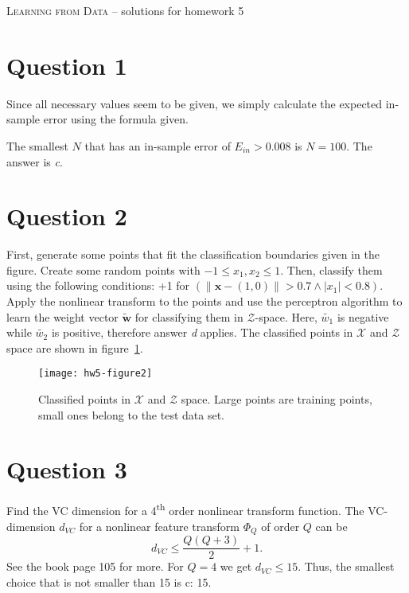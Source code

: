 \documentclass[	11pt,
				a4paper,
				twoside,
				titlepage,
				bibtotoc,
				openright,
				cleardoublepage=empty
				]{scrartcl}
\begin{document}
	
\textsc{Learning from Data} -- solutions for homework 5


\onehalfspacing
\raggedbottom
\pagestyle{plain}





\section{Question 1} %
Since all necessary values seem to be given, we simply calculate the expected in-sample error using the formula given.

The smallest $N$ that has an in-sample error of $E_{in} > 0.008$ is $N = 100$. The answer is \emph{c}.
\vspace{\baselineskip}




\section{Question 2} %
First, generate some points that fit the classification boundaries given in the figure. Create some random points with $-1 \leq x_1, x_2 \leq 1$. Then, classify them using the following conditions: +1 for $(\| \mathbf{x} - (1,0) \| > 0.7 \land |x_1| < 0.8)$. Apply the nonlinear transform to the points and use the perceptron algorithm to learn the weight vector $\tilde{\mathbf{w}}$ for classifying them in $\mathcal{Z}$-space. Here, $\tilde{w_1}$ is negative while $\tilde{w_2}$ is positive, therefore answer \emph{d} applies. The classified points in $\mathcal{X}$ and $\mathcal{Z}$ space are shown in figure~\ref{fig:2}.
\begin{figure}[!h]
	\texttt{[image: hw5-figure2]}
	\caption{Classified points in $\mathcal{X}$ and $\mathcal{Z}$ space. Large points are training points, small ones belong to the test data set.}
	\label{fig:2}
\end{figure}
\clearpage


\section{Question 3} %
Find the VC dimension for a 4\textsuperscript{th} order nonlinear transform function.
The VC-dimension $d_{VC}$ for a nonlinear feature transform $\Phi_Q$ of order $Q$ can be
\begin{equation}
d_{VC} \leq \frac{Q(Q+3)}{2} + 1.
\end{equation}
See the book page 105 for more.
For $Q = 4$ we get $d_{VC} \leq 15$. Thus, the smallest choice that is not smaller than 15 is c: 15.
\vspace{\baselineskip}
\end{document}
